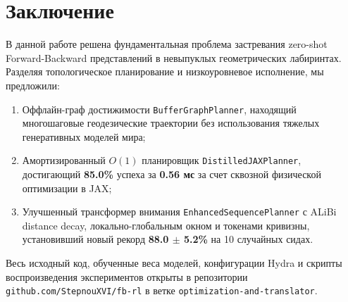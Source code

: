 \section{Заключение}

В данной работе решена фундаментальная проблема застревания zero-shot Forward-Backward представлений в невыпуклых геометрических лабиринтах. Разделяя топологическое планирование и низкоуровневое исполнение, мы предложили:
\begin{enumerate}[leftmargin=*,noitemsep]
    \item Оффлайн-граф достижимости \texttt{BufferGraphPlanner}, находящий многошаговые геодезические траектории без использования тяжелых генеративных моделей мира;
    \item Амортизированный $O(1)$ планировщик \texttt{DistilledJAXPlanner}, достигающий \textbf{85.0\%} успеха за \textbf{0.56 мс} за счет сквозной физической оптимизации в JAX;
    \item Улучшенный трансформер внимания \texttt{EnhancedSequencePlanner} с ALiBi distance decay, локально-глобальным окном и токенами кривизны, установивший новый рекорд \textbf{88.0 $\pm$ 5.2\%} на 10 случайных сидах.
\end{enumerate}

Весь исходный код, обученные веса моделей, конфигурации Hydra и скрипты воспроизведения экспериментов открыты в репозитории \texttt{github.com/StepnouXVI/fb-rl} в ветке \texttt{optimization-and-translator}.
